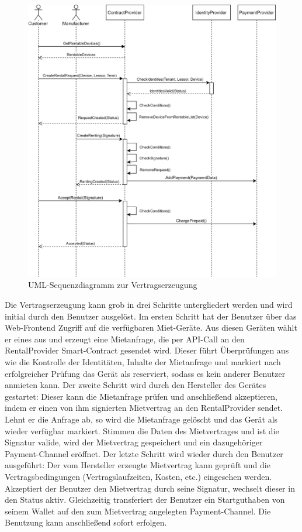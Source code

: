 \begin{figure}[h]
 \centering
 \includegraphics[width=1.0\textwidth]{gfx/UML_Seq-ContractCreation.png}
 \caption{UML-Sequenzdiagramm zur Vertragserzeugung}
 \label{fig:chapter07:creation}
\end{figure}
Die Vertragserzeugung kann grob in drei Schritte untergliedert werden und wird initial durch den Benutzer ausgelöst. Im ersten Schritt hat der Benutzer über das Web-Frontend Zugriff auf die verfügbaren Miet-Geräte. Aus diesen Geräten wählt er eines aus und erzeugt eine Mietanfrage, die per API-Call an den RentalProvider Smart-Contract gesendet wird. Dieser führt Überprüfungen aus wie die Kontrolle der Identitäten, Inhalte der Mietanfrage und markiert nach erfolgreicher Prüfung das Gerät als reserviert, sodass es kein anderer Benutzer anmieten kann. Der zweite Schritt wird durch den Hersteller des Gerätes gestartet: Dieser kann die Mietanfrage prüfen und anschließend akzeptieren, indem er einen von ihm signierten Mietvertrag an den RentalProvider sendet. Lehnt er die Anfrage ab, so wird die Mietanfrage gelöscht und das Gerät als wieder verfügbar markiert. Stimmen die Daten des Mietvertrages und ist die Signatur valide, wird der Mietvertrag gespeichert und ein dazugehöriger Payment-Channel eröffnet. Der letzte Schritt wird wieder durch den Benutzer ausgeführt: Der vom Hersteller erzeugte Mietvertrag kann geprüft und die Vertragsbedingungen (Vertragslaufzeiten, Kosten, etc.) eingesehen werden. Akzeptiert der Benutzer den Mietvertrag durch seine Signatur, wechselt dieser in den Status aktiv. Gleichzeitig transferiert der Benutzer ein Startguthaben von seinem Wallet auf den zum Mietvertrag angelegten Payment-Channel. Die Benutzung kann anschließend sofort erfolgen.

